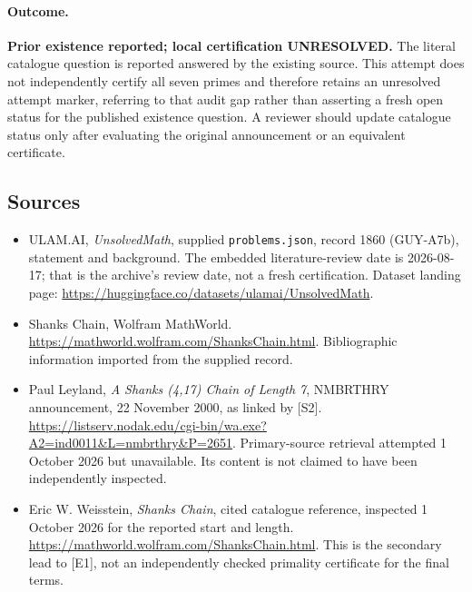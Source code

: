 \documentclass[11pt,a4paper]{article}
\begin{document}
\paragraph{Outcome.}
\textbf{Prior existence reported; local certification UNRESOLVED.}
The literal catalogue question is reported answered by the existing
source. This attempt does not independently certify all seven primes
and therefore retains an unresolved attempt marker, referring to that
audit gap rather than asserting a fresh open status for the published
existence question. A reviewer should update catalogue status only
after evaluating the original announcement or an equivalent certificate.

\subsection{Sources}

{\small

\begin{itemize}

\item[\hypertarget{source:1860:1}{S1}] ULAM.AI, \emph{UnsolvedMath}, supplied \texttt{problems.json}, record 1860 (GUY-A7b), statement and background. The embedded literature-review date is 2026-08-17; that is the archive’s review date, not a fresh certification. Dataset landing page: \url{https://huggingface.co/datasets/ulamai/UnsolvedMath}.

\item[\hypertarget{source:1860:2}{S2}] Shanks Chain, Wolfram MathWorld. \url{https://mathworld.wolfram.com/ShanksChain.html}. Bibliographic information imported from the supplied record.


\item[E1] Paul Leyland, \emph{A Shanks (4,17) Chain of Length 7},
NMBRTHRY announcement, 22 November 2000, as linked by [S2].
\url{https://listserv.nodak.edu/cgi-bin/wa.exe?A2=ind0011&L=nmbrthry&P=2651}.
Primary-source retrieval attempted 1 October 2026 but unavailable.
Its content is not claimed to have been independently inspected.
\item[E2] Eric W. Weisstein, \emph{Shanks Chain}, cited catalogue
reference, inspected 1 October 2026 for the reported start and length.
\url{https://mathworld.wolfram.com/ShanksChain.html}.
This is the secondary lead to [E1], not an independently checked
primality certificate for the final terms.

\end{itemize}

}

\label{end:1860}
\end{document}
